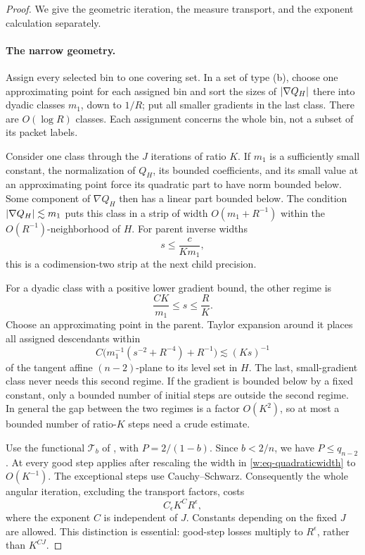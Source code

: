 \begin{proof}
We give the geometric iteration, the measure transport, and the
exponent calculation separately.

\paragraph{The narrow geometry.}
Assign every selected bin to one covering set.  In a set of type
\textup{(b)}, choose one approximating point for each assigned bin and
sort the sizes of $\lvert \nabla Q_H\rvert$ there into dyadic classes $m_1$,
down to $1/R$; put all smaller gradients in the last class.  There are
$O(\log R)$ classes.  Each assignment concerns the whole bin, not a
subset of its packet labels.

Consider one class through the $J$ iterations of ratio $K$.  If $m_1$
is a sufficiently small constant, the normalization of $Q_H$, its
bounded coefficients, and its small value at an approximating point
force its quadratic part to have norm bounded below.  Some component
of $\nabla Q_H$ then has a linear part bounded below.  The condition
$\lvert \nabla Q_H\rvert\lesssim m_1$ puts this class in a strip of width
$O(m_1+R^{-1})$ within the $O(R^{-1})$-neighborhood of $H$.
For parent inverse widths
\[
 s\leq \frac{c}{Km_1},
\]
this is a codimension-two strip at the next child precision.

For a dyadic class with a positive lower gradient bound, the other
regime is
\[
 \frac{CK}{m_1}\leq s\leq \frac{R}{K}.
\]
Choose an approximating point in the parent.  Taylor expansion around
it places all assigned descendants within
\begin{equation}\label{w:eq-quadraticwidth}
 C\bigl(m_1^{-1}(s^{-2}+R^{-4})+R^{-1}\bigr)
 \lesssim (Ks)^{-1}
\end{equation}
of the tangent affine $(n-2)$-plane to its level set in $H$.
The last, small-gradient class never needs this second regime.  If the
gradient is bounded below by a fixed constant, only a bounded number
of initial steps are outside the second regime.  In general the gap
between the two regimes is a factor $O(K^2)$, so at most a bounded
number of ratio-$K$ steps need a crude estimate.

Use the functional $\mathcal T_b$ of , with
$P=2/(1-b)$.  Since $b<2/n$, we have $P\leq q_{n-2}$.
At every good step  applies after rescaling the width in
\eqref{w:eq-quadraticwidth} to $O(K^{-1})$.  The exceptional steps use
Cauchy--Schwarz.  Consequently the whole angular iteration, excluding
the transport factors, costs
\begin{equation}\label{w:eq-Kcost}
 C_\epsilon K^C R^\epsilon,
\end{equation}
where the exponent $C$ is independent of $J$.  Constants depending on
the fixed $J$ are allowed.  This distinction is essential: good-step
losses multiply to $R^\epsilon$, rather than $K^{CJ}$.


\end{proof}
